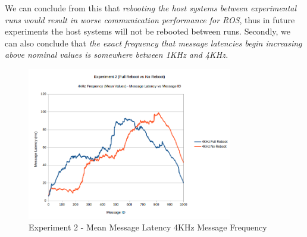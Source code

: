 \documentclass[../dissertation.tex]{subfiles}
\begin{document}
We can conclude from this that \textit{rebooting the host systems between experimental runs would result in worse communication performance for ROS}, thus in future experiments the host systems will not be rebooted between runs. Secondly, we can also conclude that \textit{the exact frequency that message latencies begin increasing above nominal values is somewhere between 1KHz and 4KHz.}

\begin{figure}[tb]
\centering
\includegraphics[width=0.8\textwidth]{images/experiment2/4khz-mean.png}
\caption{Experiment 2 - Mean Message Latency 4KHz Message Frequency}
\label{exp2-4khz-mean}
\end{figure}
\end{document}
